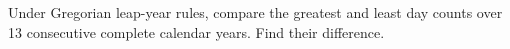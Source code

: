 Under Gregorian leap-year rules, compare the greatest and least day counts over 13 consecutive complete calendar years. Find their difference.
